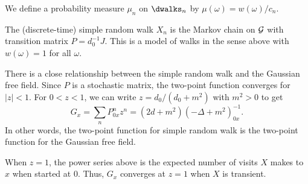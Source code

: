 We define a probability measure $\mu_n$ on $\dwalks_n$ by $\mu(\omega) = w(\omega) / c_n$.


\begin{example}
The (discrete-time) simple random walk $X_n$ is the Markov chain on $\mathcal{G}$ with
transition matrix $P = d_0^{-1} J$. This is a model of walks in the sense above
with $w(\omega) = 1$ for all $\omega$.

There is a close relationship between the
simple random walk and the Gaussian free field. Since $P$ is a stochastic matrix,
the two-point function converges for $|z| < 1$. For $0 < z < 1$, we can write
$z = d_0 / (d_0 + m^2)$ with $m^2 > 0$ to get
\begin{equation}
G_x = \sum_n P^n_{0x} z^n = (2 d + m^2) (-\Delta + m^2)^{-1}_{0x}.
\end{equation}
In other words, the two-point function for simple random walk is the two-point
function for the Gaussian free field.

When $z = 1$, the power series above is the expected number of visits $X$ makes
to $x$ when started at $0$. Thus, $G_x$ converges at $z = 1$ when $X$ is transient.
\end{example}




